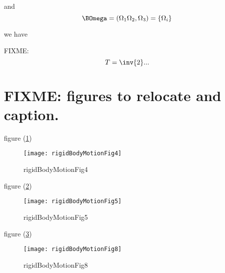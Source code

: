 and 
\begin{equation}\label{eqn:rigidBodyMotion:480}
\BOmega = ( \Omega_{1} \Omega_{2}, \Omega_{3} ) = \{ \Omega_{i} \}
\end{equation}

we have

FIXME:
\begin{equation}\label{eqn:rigidBodyMotion:500}
T = \inv{2} ...
\end{equation}

\section{FIXME: figures to relocate and caption.}
figure (\ref{fig:rigidBodyMotion:rigidBodyMotionFig4})
\begin{figure}[htp]
   \centering
   \texttt{[image: rigidBodyMotionFig4]}
   \caption{rigidBodyMotionFig4}\label{fig:rigidBodyMotion:rigidBodyMotionFig4}
\end{figure}
figure (\ref{fig:rigidBodyMotion:rigidBodyMotionFig5})
\begin{figure}[htp]
   \centering
   \texttt{[image: rigidBodyMotionFig5]}
   \caption{rigidBodyMotionFig5}\label{fig:rigidBodyMotion:rigidBodyMotionFig5}
\end{figure}
figure (\ref{fig:rigidBodyMotion:rigidBodyMotionFig8})
\begin{figure}[htp]
   \centering
   \texttt{[image: rigidBodyMotionFig8]}
   \caption{rigidBodyMotionFig8}\label{fig:rigidBodyMotion:rigidBodyMotionFig8}
\end{figure}

\EndNoBibArticle
